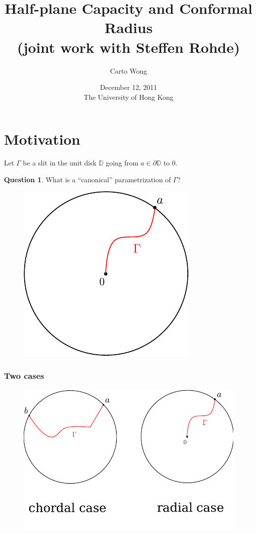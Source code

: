 \documentclass[xcolor=pdftex,dvipsnames,table]{beamer}
\title{Half-plane Capacity and Conformal Radius\\
       (joint work with Steffen Rohde)}
\author{Carto Wong}
\institute{University of Washington}
\date{December 12, 2011\\The University of Hong Kong}
\newcommand{\bbD}{\mathbb{D}}
\newcommand{\gR}{\Gamma}
\theoremstyle{definition}
\newtheorem{question}{Question}
\begin{document}
\maketitle

\section{Motivation}

\begin{frame}
  Let $\gR$ be a slit in the unit disk $\bbD$ going from $a \in \partial \bbD$ to 0.
  \begin{question}
    What is a ``canonical'' parametrization of $\gR$?
  \end{question}
  \begin{figure}
    \includegraphics[scale=0.8]{figures/radialSlit.pdf}
  \end{figure}
\end{frame}

\begin{frame}
  \frametitle{Two cases}
  \begin{figure}
    \includegraphics[scale=0.6]{figures/twoCases.pdf}
  \end{figure}
\end{frame}
\end{document}
